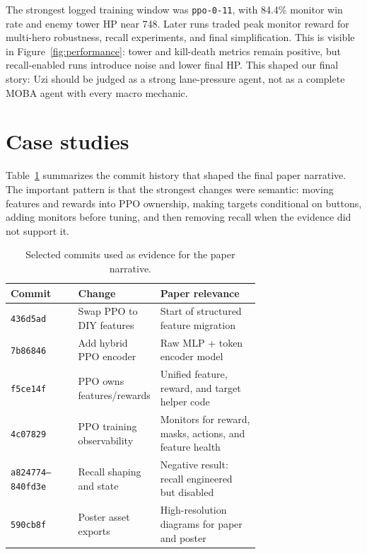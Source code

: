 \documentclass{article}
\begin{document}
The strongest logged training window was \texttt{ppo-0-11}, with 84.4\% monitor win rate and enemy tower HP near 748. Later runs traded peak monitor reward for multi-hero robustness, recall experiments, and final simplification. This is visible in Figure~\ref{fig:performance}: tower and kill-death metrics remain positive, but recall-enabled runs introduce noise and lower final HP. This shaped our final story: Uzi should be judged as a strong lane-pressure agent, not as a complete MOBA agent with every macro mechanic.

\section{Case studies}

Table~\ref{tab:commit-timeline} summarizes the commit history that shaped the final paper narrative. The important pattern is that the strongest changes were semantic: moving features and rewards into PPO ownership, making targets conditional on buttons, adding monitors before tuning, and then removing recall when the evidence did not support it.

\begin{table}[t]
  \centering
  \caption{Selected commits used as evidence for the paper narrative.}
  \label{tab:commit-timeline}
  \small
  \begin{tabular}{@{}l>{\raggedright\arraybackslash}p{0.30\linewidth}>{\raggedright\arraybackslash}p{0.40\linewidth}@{}}
    \toprule
    Commit & Change & Paper relevance \\
    \midrule
    \texttt{436d5ad} & Swap PPO to DIY features & Start of structured feature migration \\
    \texttt{7b86846} & Add hybrid PPO encoder & Raw MLP + token encoder model \\
    \texttt{f5ce14f} & PPO owns features/rewards & Unified feature, reward, and target helper code \\
    \texttt{4c07829} & PPO training observability & Monitors for reward, masks, actions, and feature health \\
    \texttt{a824774--840fd3e} & Recall shaping and state & Negative result: recall engineered but disabled \\
    \texttt{590cb8f} & Poster asset exports & High-resolution diagrams for paper and poster \\
    \bottomrule
  \end{tabular}
\end{table}
\end{document}
